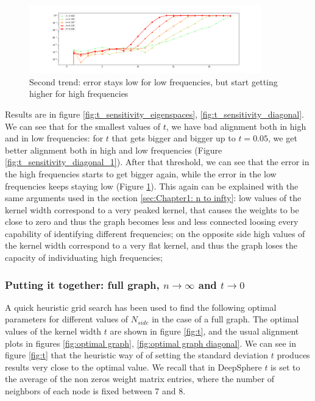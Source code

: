 \begin{figure}
	\centering
	\includegraphics[width=0.9\textwidth]{../codes/02.HeatKernelGraphLaplacian/HEALPix/06_figures/t_sensitivity_diagonal_2.png}
	\caption{Second trend: error stays low for low frequencies, but start getting higher for high frequencies}
	\label{fig:t_sensitivity_diagonal_2}
	\vspace{0.5cm}
\end{figure}
Results are in figure \ref{fig:t_sensitivity_eigenspaces}, \ref{fig:t_sensitivity_diagonal}. We can see that for the smallest values of $t$, we have bad alignment both in high and in low frequencies: for $t$ that gets bigger and bigger up to $t=0.05$, we get better alignment both in high and low frequencies (Figure \ref{fig:t_sensitivity_diagonal_1}).  After that threshold, we can see that the error in the high frequencies starts to get bigger again, while the error in the low frequencies keeps staying low (Figure \ref{fig:t_sensitivity_diagonal_2}). This again can be explained with the same arguments used in the section \ref{sec:Chapter1: n to infty}: low values of the kernel width correspond to a very peaked kernel, that causes the weights to be close to zero and thus the graph becomes less and less connected loosing every capability of identifying different frequencies; on the opposite side high values of the kernel width correspond to a very flat kernel, and thus the graph loses the capacity of individuating high frequencies;

\subsubsection{Putting it together: full graph, $n\to\infty$ and $t\to 0$}
A quick heuristic grid search has been used to find the following optimal parameters for different values of $N_{side}$ in the case of a full graph. The optimal values of the kernel width $t$ are shown in figure \ref{fig:t}, and the usual alignment plots in figures \ref{fig:optimal graph}, \ref{fig:optimal graph diagonal}. We can see in figure \ref{fig:t} that the heuristic way of \cite{DeepSphere} of setting the standard deviation $t$ produces results very close to the optimal value. We recall that in DeepSphere $t$ is set to the average of the non zeros weight matrix entries, where the number of neighbors of each node is fixed between 7 and 8.

